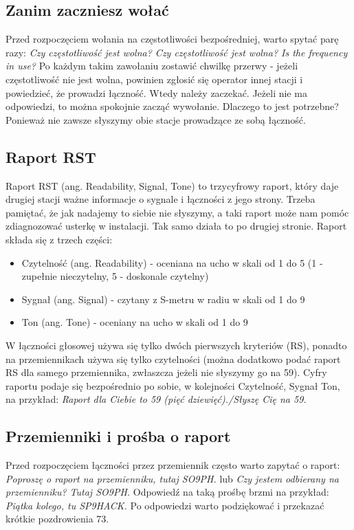 \documentclass[a4paper,11pt]{article}
\begin{document}
\subsection{Zanim zaczniesz wołać}
Przed rozpoczęciem wołania na częstotliwości bezpośredniej, warto spytać parę razy: \textit{Czy częstotliwość jest wolna? Czy częstotliwość jest wolna? Is the frequency in use?} Po każdym takim zawołaniu zostawić chwilkę przerwy - jeżeli częstotliwość nie jest wolna, powinien zgłosić się operator innej stacji i powiedzieć, że prowadzi łączność. Wtedy należy zaczekać. Jeżeli nie ma odpowiedzi, to można spokojnie zacząć wywołanie. Dlaczego to jest potrzebne? Ponieważ nie zawsze słyszymy obie stacje prowadzące ze sobą łączność.
\subsection{Raport RST}
Raport RST (ang. Readability, Signal, Tone) to trzycyfrowy raport, który daje drugiej stacji ważne informacje o sygnale i łączności z jego strony. Trzeba pamiętać, że jak nadajemy to siebie nie słyszymy, a taki raport może nam pomóc zdiagnozować usterkę w instalacji. Tak samo działa to po drugiej stronie. Raport składa się z trzech części:
\begin{itemize}
\item Czytelność (ang. Readability) - oceniana na ucho w skali od 1 do 5 (1 - zupełnie nieczytelny, 5 - doskonale czytelny)
\item Sygnał (ang. Signal) - czytany z S-metru w radiu w skali od 1 do 9
\item Ton (ang. Tone) - oceniany na ucho w skali od 1 do 9
\end{itemize}
W łączności głosowej używa się tylko dwóch pierwszych kryteriów (RS), ponadto na przemiennikach używa się tylko czytelności (można dodatkowo podać raport RS dla samego przemiennika, zwłaszcza jeżeli nie słyszymy go na 59). Cyfry raportu podaje się bezpośrednio po sobie, w kolejności Czytelność, Sygnał Ton, na przykład: \textit{Raport dla Ciebie to 59 (pięć dziewięć)./Słyszę Cię na 59.}
\subsection{Przemienniki i prośba o raport}
Przed rozpoczęciem łączności przez przemiennik często warto zapytać o raport: \textit{Poproszę o raport na przemienniku, tutaj SO9PH.} lub \textit{Czy jestem odbierany na przemienniku? Tutaj SO9PH.} Odpowiedź na taką prośbę brzmi na przykład: \textit{Piątka kolego, tu SP9HACK.} Po odpowiedzi warto podziękować i przekazać krótkie pozdrowienia 73.
\end{document}
